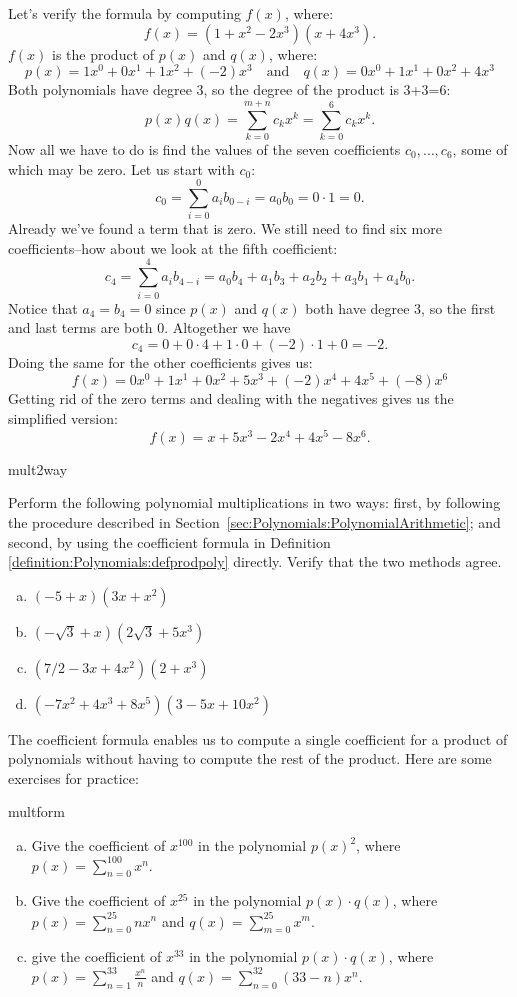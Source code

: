 Let's verify the formula by computing $f(x)$, where:
\[ f(x)=(1+x^2-2x^3)(x+4x^3). \]
$f(x)$ is the product of $p(x)$ and $q(x)$, where:
\[p(x)= 1x^0 + 0x^1 + 1x^2 + (-2)x^3  \quad \text{and} \quad q(x)= 0x^0 + 1x^1 + 0x^2 + 4x^3 \]
Both polynomials have degree 3, so the degree of the product is 3+3=6:
\[
p(x) q(x) = \sum_{k=0}^{m+n} c_k  x^k =  \sum_{k=0}^{6} c_k x^k. 
\]
Now all we have to do is find the values of the seven coefficients $c_0, \ldots,c_6$, some of which may be zero.  Let us start with $c_0$:
\[ c_0 = \sum_{i = 0}^0 a_i b_{0 - i} = a_0b_0= 0 \cdot 1 = 0. \]
Already we've found a term that is zero.  We still need to find six more coefficients--how about we look at the fifth coefficient:
\[ c_4 =  \sum_{i = 0}^4 a_i b_{4 - i} =   a_0b_4 + a_1b_3 +a_2b_2 + a_3b_1 + a_4b_0.\]
Notice that $a_4=b_4=0$ since $p(x)$ and $q(x)$ both have degree 3, so the first and last terms are both 0. Altogether we have 
\[ c_4=0+0\cdot 4+1\cdot 0+(-2)\cdot 1+0=-2.\]
Doing the same for the other coefficients gives us:
\[f(x)= 0x^0+ 1x^1 + 0x^2 + 5x^3 + (-2)x^4 + 4x^5 + (-8)x^6 \]
Getting rid of the zero terms and dealing with the negatives gives us the simplified version:
\[f(x)=x+5x^3-2x^4+4x^5-8x^6. \]
\begin{exercise}{mult2way}

Perform the following polynomial multiplications in two ways: first, by following the procedure described in Section~\ref{sec:Polynomials:PolynomialArithmetic}; and second, by using the coefficient formula in Definition \ref{definition:Polynomials:defprodpoly} directly.  Verify that the two methods agree.
\begin{enumerate}[(a)]
\item
$(-5+x)(3x+ x^2)$
\item
$(-\sqrt{3}+x)(2\sqrt{3}+5x^3)$
\item
$(7/2- 3x+4x^2)(2+x^3)$
\item
$(- 7x^2 + 4x^3+8x^5 )(3-5x+10x^2 )$
\end{enumerate}
\end {exercise}

The coefficient formula enables us to compute a single coefficient for a product of polynomials without having 
to compute the rest of the product. Here are some exercises for practice:

\begin{exercise}{multform}
\begin{enumerate}[(a)]
\item
Give the coefficient of $x^{100}$ in the polynomial $p(x)^2$, where $p(x) = \sum_{n=0}^{100} x^n$.
\item
Give the coefficient of $x^{25}$ in the polynomial $p(x) \cdot q(x)$, where $p(x) = \sum_{n=0}^{25} nx^n$  and $q(x) = \sum_{m=0}^{25} x^m$.
\item
give the coefficient of $x^{33}$ in the polynomial 
$p(x) \cdot q(x)$, where  $p(x) = \sum_{n=1}^{33} \frac{x^n}{n}$ and  $q(x) = \sum_{n=0}^{32} (33-n)x^n$.
\end{enumerate}
\end {exercise}

